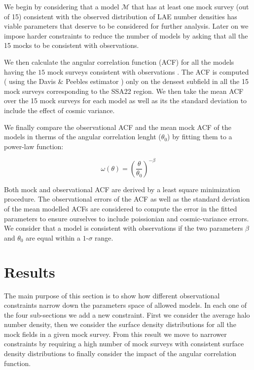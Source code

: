 \documentclass[usenatbib]{mn2e}
\begin{document}
We begin by considering that  a model ${\mathcal M}$ that has at least
one mock survey (out of 15) consistent with the observed
distribution of LAE number densities has viable parameters that
deserve to be considered for further analysis. Later on we impose
harder constraints to reduce the number of models by asking that all
the 15 mocks to be consistent with observations.




We then calculate the  angular correlation function (ACF)
for all the models having the $15$ mock surveys consistent with
observations . The ACF is computed  ( using 
the Davis \& Peebles  estimator \citep{Davis1983} ) only on the densest
subfield in all the 15 mock surveys corresponding to the SSA22
region. We then take the mean ACF over the 15  mock surveys  for
each model as well as its the standard deviation to include
the effect of cosmic variance. 

We finally compare the observational ACF and the mean mock  ACF of the models   
in therms of the angular correlation lenght ($\theta_{0}$) by fitting 
them to a power-law function:  

\begin{equation}
\omega(\theta) = \left(\frac{\theta}{\theta_{0}}\right)^{-\beta}
\label{eq:fitting}
\end{equation}

Both mock and observational ACF are derived by a least
square minimization procedure. The observational errors of 
the ACF as well as the standard deviation of the mean modelled ACFs  are
considered to compute the error in the fitted parameters to ensure ourselves
to include poissionian and cosmic-variance errors. 
We consider that a model is consistent with observations if the two parameters $\beta$ and $\theta_0$ are
equal within a $1$-$\sigma$ range.



 
\section{Results}
\label{sec:results}

The main purpose of this section is to show how different
observational constraints narrow down the parameters space of allowed
models. In each one of the four sub-sections we add a new
constraint. First we consider the average halo number density, then we
consider the surface density distributions for all the mock fields in
a given mock survey. From this result we move to narrower constraints
by requiring a high number of mock surveys with consistent surface
density distributions to finally consider the impact of the angular
correlation function. 
\end{document}
